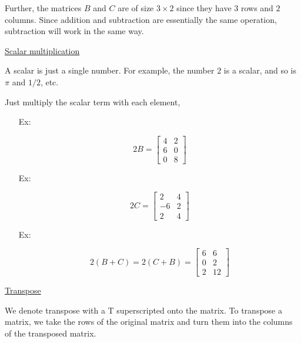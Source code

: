 \documentclass[reqno]{amsart}
\theoremstyle{definition}
\begin{document}
Further, the matrices $B$ and $C$ are of size $3 \times 2$ since they have $3$ rows and $2$ columns.  Since addition and subtraction are essentially the same operation, subtraction will work in the same way.

\bigskip

\underline{Scalar multiplication}

A scalar is just a single number.  For example, the number $2$ is a scalar, and so is $\pi$ and $1/2$, etc.

Just multiply the scalar term with each element,
%
\begin{itemize}

\item[Ex:  ]

\begin{equation*}
2B = \begin{bmatrix}
4 & 2\\
6 & 0\\
0 & 8
\end{bmatrix}
\end{equation*}

\item[Ex:  ]

\begin{equation*}
2C = \begin{bmatrix}
2 & 4\\
-6 & 2\\
2 & 4
\end{bmatrix}
\end{equation*}

\item[Ex:  ]

\begin{equation*}
2(B+C) = 2(C+B) = \begin{bmatrix}
6 & 6\\
0 & 2\\
2 & 12
\end{bmatrix}
\end{equation*}

\end{itemize}

\bigskip

\underline{Transpose}

We denote transpose with a T superscripted onto the matrix.  To transpose a matrix, we take the rows of the original matrix and turn them into the columns of the transposed matrix.
\end{document}
